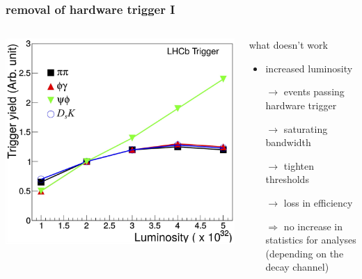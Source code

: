 \documentclass[table,xcolor=dvipsnames,professionalfonts]{beamer}
\begin{document}
\begin{frame}
  \frametitle{removal of hardware trigger I}
  \begin{columns}
  \begin{column}{.6\textwidth}
    \includegraphics[width=\textwidth]{./dijkstra.png}
  \end{column}
  \begin{column}{.4\textwidth}
    \begin{alertblock}{what doesn't work}
    \begin{itemize}
        \item increased luminosity
        \item[$\rightarrow$] events passing hardware trigger
        \item[$\rightarrow$] saturating bandwidth
        \item[$\rightarrow$] tighten thresholds
        \item[$\rightarrow$] loss in efficiency
        \item[$\Rightarrow$] no increase in statistics for analyses
        \newline (depending on the decay channel)
    \end{itemize}
  \end{alertblock}
  \end{column}
  \end{columns}
\end{frame}
\end{document}
